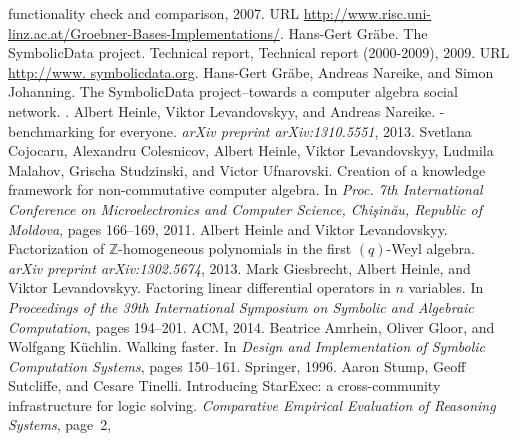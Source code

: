 \documentclass[oribibl,11pt]{article}
\begin{document}
\begin{thebibliography}{21}
{  {f}unctionality {c}heck and {c}omparison}, 2007.
\newblock URL
  \url{http://www.risc.uni-linz.ac.at/Groebner-Bases-Implementations/}.
\vspace*{-10pt}
Hans-Gert Gr{\"a}be.
\newblock The {\sc SymbolicData} project.
\newblock Technical report, Technical report (2000-2009), 2009.
\newblock URL \url{http://www. symbolicdata.org}.
\vspace*{-10pt}
Hans-Gert Gr{\"a}be, Andreas Nareike, and Simon Johanning.
\newblock The {\sc SymbolicData} project--towards a computer algebra social
  network.
.
\vspace*{-10pt}
Albert Heinle, Viktor Levandovskyy, and Andreas Nareike.
 - benchmarking for everyone.
\newblock \emph{arXiv preprint arXiv:1310.5551}, 2013.
\vspace*{-10pt}
Svetlana Cojocaru, Alexandru Colesnicov, Albert Heinle, Viktor Levandovskyy,
  Ludmila Malahov, Grischa Studzinski, and Victor Ufnarovski.
\newblock Creation of a knowledge framework for non-commutative computer
  algebra.
\newblock In \emph{Proc. 7th International Conference on Microelectronics and
  Computer Science, Chi\c{s}in\u{a}u, Republic of Moldova}, pages 166--169,
  2011.
\vspace*{-10pt}
Albert Heinle and Viktor Levandovskyy.
\newblock Factorization of $\mathbb{Z}$-homogeneous polynomials in the first
  $(q)$-{W}eyl algebra.
\newblock \emph{arXiv preprint arXiv:1302.5674}, 2013.
\vspace*{-10pt}
Mark Giesbrecht, Albert Heinle, and Viktor Levandovskyy.
\newblock Factoring linear differential operators in $n$ variables.
\newblock In \emph{Proceedings of the 39th International Symposium on Symbolic
  and Algebraic Computation}, pages 194--201. ACM, 2014.
\vspace*{-10pt}
Beatrice Amrhein, Oliver Gloor, and Wolfgang K{\"u}chlin.
\newblock Walking faster.
\newblock In \emph{Design and Implementation of Symbolic Computation Systems},
  pages 150--161. Springer, 1996.
\vspace*{-10pt}
Aaron Stump, Geoff Sutcliffe, and Cesare Tinelli.
\newblock Introducing {S}tar{E}xec: a cross-community infrastructure for logic
  solving.
\newblock \emph{Comparative Empirical Evaluation of Reasoning Systems}, page~2,

\end{thebibliography}
\end{document}
